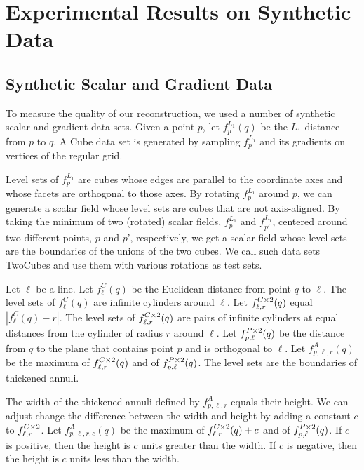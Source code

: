 
\newcommand{\fCII} {\emath{f^{C \times 2}}}
\newcommand{\fPII} {\emath{f^{P \times 2}}}
\section{Experimental Results on Synthetic Data}\label{sec:synData}
\subsection{Synthetic Scalar and Gradient Data}
\label{section:synthetic}

To measure the quality of our reconstruction,
we used a number of synthetic scalar and gradient data sets.
Given a point $p$,
let $f^{L_1}_{p}(q)$ be the $L_1$ distance from $p$ to $q$.
A Cube data set is generated by sampling $f^{L_1}_p$
and its gradients on vertices of the regular grid.

Level sets of $f^{L_1}_p$ are cubes whose edges are
parallel to the coordinate axes
and whose facets are orthogonal to those axes.
By rotating $f^{L_1}_p$ around $p$, 
we can generate a scalar field whose level sets are cubes
that are not axis-aligned.
By taking the minimum of two (rotated) scalar fields, 
$f^{L_1}_p$ and $f^{L_1}_{p'}$, 
centered around two different points, $p$ and $p$', respectively,
we get a scalar field whose level sets are the boundaries
of the unions of the two cubes.
We call such data sets TwoCubes and use them 
with various rotations as test sets.

Let $\ell$ be a line.
Let $f^C_{\ell}(q)$ be the Euclidean distance from point $q$ to $\ell$.
The level sets of $f^C_{\ell}(q)$ are infinite cylinders around $\ell$.
Let $\fCII_{\ell,r}(q)$ equal $|f^C_{\ell}(q) - r|$.
The level sets of $\fCII_{\ell,r}(q)$  are pairs of infinite cylinders
at equal distances from the cylinder of radius $r$ around $\ell$.
Let $\fPII_{p,\ell}(q)$ be the distance from $q$ to the plane 
that contains point $p$ and is orthogonal to $\ell$.
Let $f^A_{p,\ell,r}(q)$ be the maximum 
of $\fCII_{\ell,r}(q)$ and of $\fPII_{p,\ell}(q)$.
The level sets are the boundaries of thickened annuli.

The width of the thickened annuli defined by $f^A_{p,\ell,r}$
equals their height.
We can adjust change the difference between the width and height
by adding a constant $c$ to $\fCII_{\ell,r}$.
Let $f^A_{p,\ell,r,c}(q)$ be the maximum 
of $\fCII_{\ell,r}(q)+c$ and of $\fPII_{p,\ell}(q)$.
If $c$ is positive, then the height is $c$ units greater than the width.
If $c$ is negative, then the height is $c$ units less than the width.

